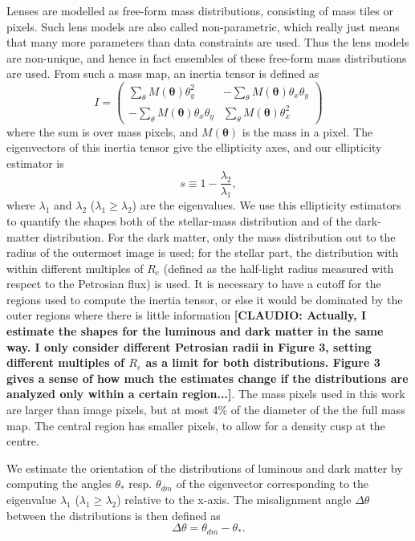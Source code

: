 \documentclass[useAMS,usenatbib]{mn2e}
\begin{document}
Lenses are modelled as free-form mass distributions, consisting of mass tiles or pixels. Such lens models are also called non-parametric, which really just means that many more parameters than data constraints are used. Thus the lens models are non-unique, and hence in fact ensembles of these free-form mass distributions are used. From such a mass map, an inertia tensor is defined as
\begin{equation}\label{eq:inertiatensor}
I = 
\begin{pmatrix}
 \sum_\theta M(\boldsymbol{\theta})\theta^{2}_{y} & -\sum_\theta M(\boldsymbol{\theta})\theta_{x}\theta_{y} \\
-\sum_\theta M(\boldsymbol{\theta})\theta_{x}\theta_{y} & \sum_\theta M(\boldsymbol{\theta})\theta^{2}_{x}
\end{pmatrix}
\end{equation}
where the sum is over mass pixels, and $M(\boldsymbol{\theta})$ is the mass in a pixel. The eigenvectors of this inertia tensor give the ellipticity axes, and our ellipticity estimator is
\begin{equation}\label{eq:shapeestimate}
    s \equiv 1 - \frac{\lambda_{2}}{\lambda_{1}},
\end{equation}
where $\lambda_{1}$ and $\lambda_{2}$ ($\lambda_{1} \geq \lambda_{2}$) are the eigenvalues. We use this ellipticity estimators to quantify the shapes both of the stellar-mass distribution and of the dark-matter distribution. For the dark matter, only the mass distribution out to the radius of the outermost image is used; for the stellar part, the distribution with within different multiples of $R_e$ (defined as the half-light radius measured with respect to the Petrosian flux) is used. It is necessary to have a cutoff for the regions used to compute the inertia tensor, or else it would be dominated by the outer regions where there is little information \textbf{[CLAUDIO: Actually, I estimate the shapes for the luminous and dark matter in the same way. I only consider different Petrosian radii in Figure 3, setting different multiples of $R_e$ as a limit for both distributions. Figure 3 gives a sense of how much the estimates change if the distributions are analyzed only within a certain region...]}. The mass pixels used in this work are larger than image pixels, but at most 4\% of the diameter of the the full mass map. The central region has smaller pixels, to allow for a density cusp at the centre.

We estimate the orientation of the distributions of luminous and dark matter by computing the angles $\theta_{*}$ resp. $\theta_{dm}$ of the eigenvector corresponding to the eigenvalue $\lambda_{1}$ ($\lambda_{1} \geq \lambda_{2}$) relative to the x-axis. The misalignment angle $\Delta\theta$ between the distributions is then defined as
\begin{equation}
  \Delta\theta = \theta_{dm} - \theta_{*}.
\end{equation}
\end{document}
